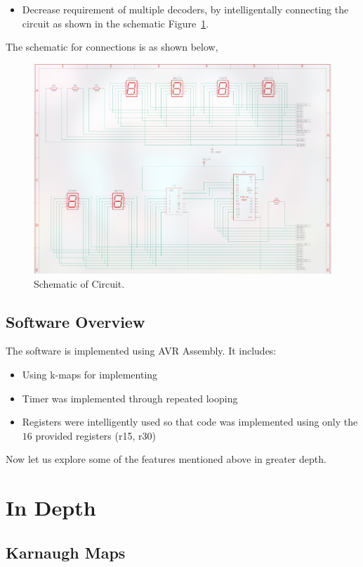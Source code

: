 \documentclass[a4paper,12pt]{article}
\begin{document}
\begin{itemize}
    \item Decrease requirement of multiple decoders, by intelligentally connecting the circuit as shown in the schematic
    Figure~\ref{fig:circuit_schematic}.
\end{itemize}
The schematic for connections is as shown below,
\begin{figure}[H]
    \centering
    \includegraphics[width=\textwidth]{figs/circuit_schematic.png}
    \caption{Schematic of Circuit.}
    \label{fig:circuit_schematic}
\end{figure}
\subsection*{Software Overview}
The software is implemented using AVR Assembly. It includes:
\begin{itemize}
    \item Using k-maps for implementing
    \item Timer was implemented through repeated looping
    \item Registers were intelligently used so that code was implemented using only the $16$ provided registers (r15, r30)
\end{itemize}
Now let us explore some of the features mentioned above in greater depth.
\section*{In Depth}
\subsection*{Karnaugh Maps}
\end{document}
